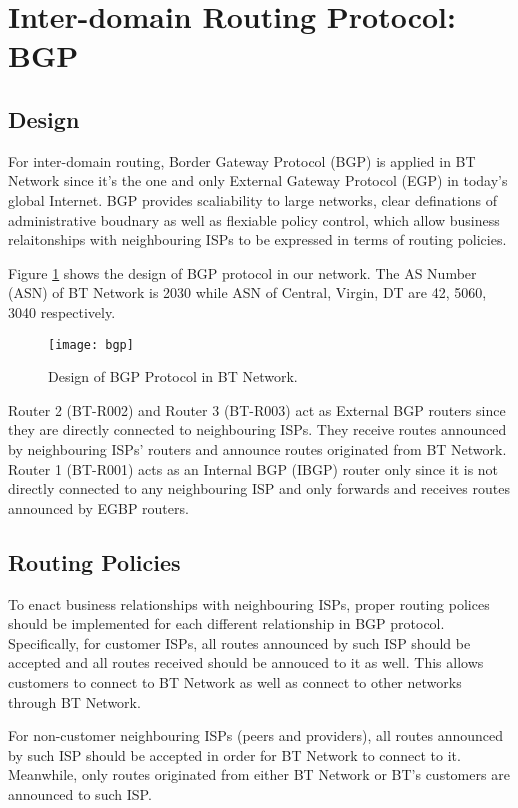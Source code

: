 \section{Inter-domain Routing Protocol: BGP}
\label{sec:bgp}

\subsection{Design}
For inter-domain routing, Border Gateway Protocol (BGP) is applied in BT Network since it's the one and only External Gateway Protocol (EGP) in today's global Internet. BGP provides scaliability to large networks, clear definations of administrative boudnary as well as flexiable policy control, which allow business relaitonships with neighbouring ISPs to be expressed in terms of routing policies.

Figure \ref{fig:bgp} shows the design of BGP protocol in our network. The AS Number (ASN) of BT Network is 2030 while ASN of Central, Virgin, DT are 42, 5060, 3040 respectively. 

\begin{figure}[ht!]
    \centering
    \texttt{[image: bgp]}
    \caption{Design of BGP Protocol in BT Network.}
    \label{fig:bgp}
\end{figure}

Router 2 (BT-R002) and Router 3 (BT-R003) act as External BGP routers since they are directly connected to neighbouring ISPs. They receive routes announced by neighbouring ISPs' routers and announce routes originated from BT Network.
Router 1 (BT-R001) acts as an Internal BGP (IBGP) router only since it is not directly connected to any neighbouring ISP and only forwards and receives routes announced by EGBP routers.




\subsection{Routing Policies}

To enact business relationships with neighbouring ISPs, proper routing polices should be implemented for each different relationship in BGP protocol. 
Specifically, for customer ISPs, all routes announced by such ISP should be accepted and all routes received should be annouced to it as well. This allows customers to connect to BT Network as well as connect to other networks through BT Network.

For non-customer neighbouring ISPs (peers and providers), all routes announced by such ISP should be accepted in order for BT Network to connect to it. Meanwhile, only routes originated from either BT Network or BT's customers are announced to such ISP.


